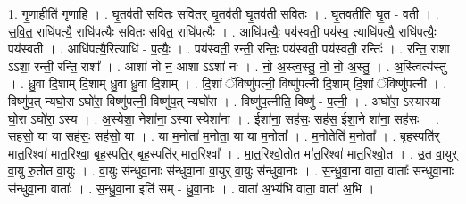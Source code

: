 \documentclass[17pt]{extarticle}
\begin{document}
1. गृ॒णा॒हीति॑ गृणाहि । . घृ॒तव॑ती सवितः सवितर् घृ॒तव॑ती घृ॒तव॑ती सवितः । . घृ॒तव॒तीति॑ घृ॒त - व॒ती॒ । . स॒वि॒त॒ राधि॑पत्यै॒ राधि॑पत्यैः सवितः सवित॒ राधि॑पत्यैः । . आधि॑पत्यैः॒ पय॑स्वती॒ पय॑स्व॒ त्याधि॑पत्यै॒ राधि॑पत्यैः॒ पय॑स्वती । . आधि॑पत्यै॒रित्याधि॑ - प॒त्यैः॒ । . पय॑स्वती॒ रन्ती॒ रन्तिः॒ पय॑स्वती॒ पय॑स्वती॒ रन्तिः॑ । . रन्ति॒ राशा ऽऽशा॒ रन्ती॒ रन्ति॒ राशा᳚ । . आशा॑ नो न॒ आशा ऽऽशा॑ नः । . नो॒ अ॒स्त्व॒स्तु॒ नो॒ नो॒ अ॒स्तु॒ । . अ॒स्त्वित्य॑स्तु । . ध्रु॒वा दि॒शाम् दि॒शाम् ध्रु॒वा ध्रु॒वा दि॒शाम् । . दि॒शां ॅविष्णु॑पत्नी॒ विष्णु॑पत्नी दि॒शाम् दि॒शां ॅविष्णु॑पत्नी । . विष्णु॑प॒त् न्यघो॒रा ऽघो॑रा॒ विष्णु॑पत्नी॒ विष्णु॑प॒त् न्यघो॑रा । . विष्णु॑प॒त्नीति॒ विष्णु॑ - प॒त्नी॒ । . अघो॑रा॒ ऽस्यास्या घो॒रा ऽघो॑रा॒ ऽस्य । . अ॒स्येशा॒ नेशा॑ना॒ ऽस्या स्येशा॑ना । . ईशा॑ना॒ सह॑सः॒ सह॑स॒ ईशा॒ने शा॑ना॒ सह॑सः । . सह॑सो॒ या या सह॑सः॒ सह॑सो॒ या । . या म॒नोता॑ म॒नोता॒ या या म॒नोता᳚ । . म॒नोतेति॑ म॒नोता᳚ । . बृह॒स्पति॑र् मात॒रिश्वा॑ मात॒रिश्वा॒ बृह॒स्पति॒र् बृह॒स्पति॑र् मात॒रिश्वा᳚ । . मा॒त॒रिश्वो॒तोत मा॑त॒रिश्वा॑ मात॒रिश्वो॒त । . उ॒त वा॒युर् वा॒यु रु॒तोत वा॒युः । . वा॒युः स॑न्धुवा॒नाः स॑न्धुवा॒ना वा॒युर् वा॒युः स॑न्धुवा॒नाः । . स॒न्धु॒वा॒ना वाता॒ वाताः᳚ सन्धुवा॒नाः स॑न्धुवा॒ना वाताः᳚ । . स॒न्धु॒वा॒ना इति॑ सम् - धु॒वा॒नाः । . वाता॑ अ॒भ्य॑भि वाता॒ वाता॑ अ॒भि । \newline
\end{document}

